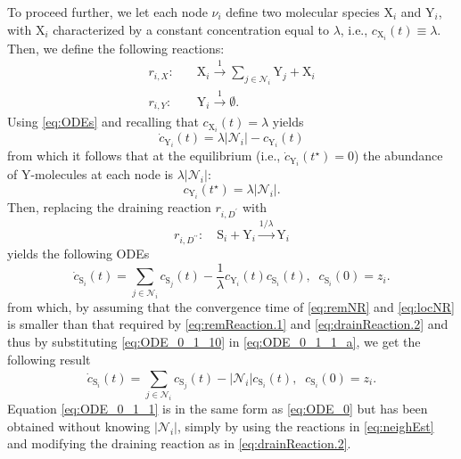 \documentclass[journal]{IEEEtran}
\newcommand{\mol}[1]{\ensuremath{\textrm{#1}}}
\begin{document}
{To proceed further, we let each node $\nu_i$ define two molecular species $\mol{X}_i$ and $\mol{Y}_i$, with $\mol{X}_i$ characterized by a constant concentration equal to $\lambda$, i.e., {$c_{\mol{X}_i}(t) \equiv \lambda$}. Then, we define the following reactions:
\begin{subequations} \label{eq:neighEst}
\begin{align} 
\label{eq:remNR}
	r_{i,X}:&  \quad \mol{X}_i \stackrel{1}{\longrightarrow} \sum_{j \in \mathcal N_i}\mol{Y}_j + \mol{X}_i  \\  	\label{eq:locNR}
	r_{i,Y}:&  \quad \mol{Y}_i \stackrel{1}{\longrightarrow} \emptyset.
\end{align} 
\end{subequations} 
Using \eqref{eq:ODEs} and recalling that $c_{\mol{X}_i}(t) = \lambda$ yields
\begin{equation}\label{eq:ODE_0_1_11}
{\dot c_{{\mol{Y}_i}}} (t)=  \lambda |\mathcal{N}_i| -  {c_{\mol{Y}_i}}(t)
\end{equation}
from which it follows that at the equilibrium (i.e., ${\dot c_{{\mol{Y}_i}}} (t^\star) = 0$) the abundance of $\mol{Y}$-molecules at each node is $\lambda|\mathcal{N}_{i}|$:
\begin{equation}\label{eq:ODE_0_1_10}
{c_{\mol{Y}_i}}(t^\star) =\lambda |\mathcal{N}_i|.
\end{equation}
Then, replacing the draining reaction $r_{i, {D}^{\prime}}$ with
\begin{equation}\label{eq:drainReaction.2}
r_{i, {D}^{\prime\prime}}:\quad \mol{S}_i +\mol{Y}_i	  \stackrel{1/\lambda}{\longrightarrow} \mol{Y}_i	
\end{equation}
yields the following ODEs
\begin{equation}\label{eq:ODE_0_1_1_a}
{\dot c_{{\mol{S}_i}}} (t)=  {\sum\limits_{j \in {\mathcal{N}_i}}^{} {{c_{{\mol{S}_j}}}}(t)} -  \frac{1}{\lambda}{{c_{\mol{Y}_i}}(t){c_{\mol{S}_i}}(t)},\;\;c_{\mol{S}_i}(0)=z_i.
\end{equation}
from which, by assuming that the convergence time of \eqref{eq:remNR} and \eqref{eq:locNR} is smaller than that required by \eqref{eq:remReaction.1} and \eqref{eq:drainReaction.2} and thus by substituting \eqref{eq:ODE_0_1_10} in \eqref{eq:ODE_0_1_1_a}, we get the following result
\begin{equation}\label{eq:ODE_0_1_1}
{\dot c_{{\mol{S}_i}}} (t)=  {\sum\limits_{j \in {\mathcal{N}_i}}^{} {{c_{{\mol{S}_j}}}}(t)} -  |\mathcal N_i|{c_{\mol{S}_i}}(t),\;\;c_{\mol{S}_i}(0)=z_i.
\end{equation} 
Equation \eqref{eq:ODE_0_1_1} is in the same form as \eqref{eq:ODE_0} but has been obtained without knowing $|\mathcal{N}_{i}|$, simply by using the reactions in \eqref{eq:neighEst} and modifying the draining reaction as in \eqref{eq:drainReaction.2}.}
\end{document}
